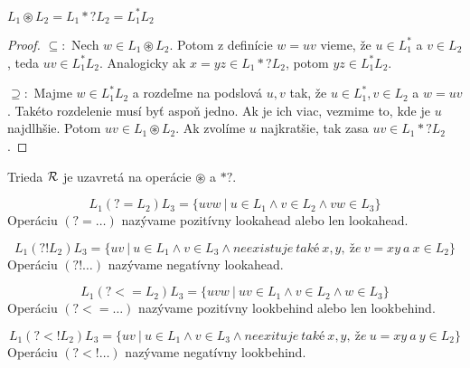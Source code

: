\begin{veta}
$L_1 \circledast L_2 = L_1 *? L_2 = L_1^*L_2$
\end{veta}
\begin{proof}
$\subseteq:$
Nech $w \in L_1 \circledast L_2$. Potom z definície $w=uv$ vieme, že $u \in L_1^*$ a $v \in L_2$, teda $uv \in L_1^*L_2$. Analogicky ak $x=yz \in L_1 *? L_2$, potom $yz \in L_1^*L_2$.

$\supseteq:$
Majme $w \in L_1^*L_2$ a rozdeľme na podslová $u,v$ tak, že $u \in L_1^*, v \in L_2$ a $w=uv$. Takéto rozdelenie musí byť aspoň jedno. Ak je ich viac, vezmime to, kde je $u$ najdlhšie. Potom $uv \in L_1 \circledast L_2$. Ak zvolíme $u$ najkratšie, tak zasa $uv \in L_1 *? L_2$.
\end{proof}

\begin{dosledok}
Trieda ${\cal R}$ je uzavretá na operácie $\circledast$ a $*?$.
\end{dosledok}

\begin{df}
$$ L_{1}(?=L_{2})L_{3} = \lbrace uvw ~|~ u \in L_{1} \land v \in L_{2} \land vw \in L_{3} \rbrace $$ Operáciu $(?=\dots)$ nazývame pozitívny lookahead alebo len lookahead.
\end{df}

\begin{df}
$$ L_{1}(?!L_{2})L_{3} = \lbrace uv ~|~ u \in L_{1} \land v \in L_{3} \land neexistuje~také~x,y,~že~v=xy~a~x \in L_2 \rbrace $$ Operáciu $(?!\dots)$ nazývame negatívny lookahead.
\end{df}

\begin{df}
$$ L_{1}(?<=L_{2})L_{3} = \lbrace uvw ~|~ uv \in L_{1} \land v \in L_{2} \land w \in L_{3} \rbrace $$ Operáciu $(?<=\dots)$ nazývame pozitívny lookbehind alebo len lookbehind.
\end{df}

\begin{df}
$$ L_{1}(?<!L_{2})L_{3} = \lbrace uv ~|~ u \in L_{1} \land v \in L_{3} \land neexituje~také~x,y,~že~u=xy~a~y \in L_2 \rbrace $$ Operáciu $(?<!\dots)$ nazývame negatívny lookbehind.
\end{df}

